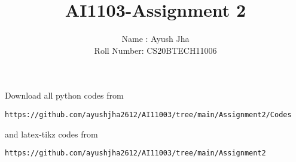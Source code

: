 \documentclass[journal,12pt,twocolumn]{IEEEtran}
\DeclareMathOperator*{\Res}{Res}
\begin{document}
\newcommand{\BEQA}{\begin{eqnarray}}
\newcommand{\EEQA}{\end{eqnarray}}
\newcommand{\define}{\stackrel{\triangle}{=}}

\raggedbottom
\setlength{\parindent}{0pt}
\providecommand{\mbf}{\mathbf}
\providecommand{\pr}[1]{\ensuremath{\Pr\left(#1\right)}}
\providecommand{\qfunc}[1]{\ensuremath{Q\left(#1\right)}}
\providecommand{\sbrak}[1]{\ensuremath{{}\left[#1\right]}}
\providecommand{\lsbrak}[1]{\ensuremath{{}\left[#1\right.}}
\providecommand{\rsbrak}[1]{\ensuremath{{}\left.#1\right]}}
\providecommand{\brak}[1]{\ensuremath{\left(#1\right)}}
\providecommand{\lbrak}[1]{\ensuremath{\left(#1\right.}}
\providecommand{\rbrak}[1]{\ensuremath{\left.#1\right)}}
\providecommand{\cbrak}[1]{\ensuremath{\left\{#1\right\}}}
\providecommand{\lcbrak}[1]{\ensuremath{\left\{#1\right.}}
\providecommand{\rcbrak}[1]{\ensuremath{\left.#1\right\}}}
\theoremstyle{remark}
\newtheorem{rem}{Remark}
\newcommand{\sgn}{\mathop{\mathrm{sgn}}}
\providecommand{\abs}[1]{\vert#1\vert}
\providecommand{\res}[1]{\Res\displaylimits_{#1}} 
\providecommand{\norm}[1]{\lVert#1\rVert}
\providecommand{\mtx}[1]{\mathbf{#1}}
\providecommand{\mean}[1]{E[ #1 ]}
\providecommand{\fourier}{\overset{\mathcal{F}}{ \rightleftharpoons}}
\providecommand{\system}{\overset{\mathcal{H}}{ \longleftrightarrow}}
\newcommand{\solution}{\noindent \textbf{Solution: }}
\newcommand{\cosec}{\,\text{cosec}\,}
\providecommand{\dec}[2]{\ensuremath{\overset{#1}{\underset{#2}{\gtrless}}}}
\newcommand{\myvec}[1]{\ensuremath{\begin{pmatrix}#1\end{pmatrix}}}
\newcommand{\mydet}[1]{\ensuremath{\begin{vmatrix}#1\end{vmatrix}}}
\makeatletter
{}
\makeatother
\let\StandardTheFigure\thefigure
\let\vec\mathbf
\renewcommand{\thefigure}{\theproblem}
\def\putbox#1#2#3{\makebox[0in][l]{\makebox[#1][l]{}\raisebox{\baselineskip}[0in][0in]{\raisebox{#2}[0in][0in]{#3}}}}
     \def\rightbox#1{\makebox[0in][r]{#1}}
     \def\centbox#1{\makebox[0in]{#1}}
     \def\topbox#1{\raisebox{-\baselineskip}[0in][0in]{#1}}
     \def\midbox#1{\raisebox{-0.5\baselineskip}[0in][0in]{#1}}
\vspace{3cm}
\title{AI1103-Assignment 2}
\author{Name : Ayush Jha \\ Roll Number: CS20BTECH11006}
\maketitle
\newpage
\bigskip
\renewcommand{\thefigure}{\theenumi}
\renewcommand{\thetable}{\theenumi}
Download all python codes from 
\begin{lstlisting}
https://github.com/ayushjha2612/AI11003/tree/main/Assignment2/Codes
\end{lstlisting}
%
and latex-tikz codes from 
%
\begin{lstlisting}
https://github.com/ayushjha2612/AI11003/tree/main/Assignment2
\end{lstlisting}
\end{document}
